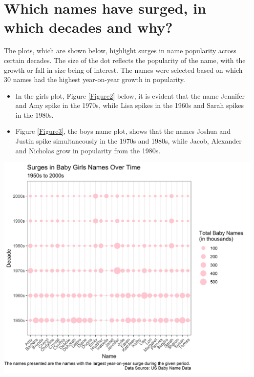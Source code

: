 \documentclass[11pt,preprint, authoryear]{elsarticle}
\let\origfigure\figure
\let\endorigfigure\endfigure
\renewenvironment{figure}[1][2] {
    \expandafter\origfigure\expandafter[H]
} {
    \endorigfigure
}
\numberwithin{equation}{section}
\numberwithin{figure}{section}
\numberwithin{table}{section}
\begin{document}
\newpage

\hypertarget{which-names-have-surged-in-which-decades-and-why}{%
\section{\texorpdfstring{Which names have surged, in which decades and
why?
\label{surge}}{Which names have surged, in which decades and why? }}\label{which-names-have-surged-in-which-decades-and-why}}

The plots, which are shown below, highlight surges in name popularity
across certain decades. The size of the dot reflects the popularity of
the name, with the growth or fall in size being of interest. The names
were selected based on which 30 names had the highest year-on-year
growth in popularity.

\begin{itemize}
\item
  In the girls plot, Figure \ref{Figure2} below, it is evident that the
  name Jennifer and Amy spike in the 1970s, while Lisa spikes in the
  1960s and Sarah spikes in the 1980s.
\item
  Figure \ref{Figure3}, the boys name plot, shows that the names Joshua
  and Justin spike simultaneously in the 1970s and 1980s, while Jacob,
  Alexander and Nicholas grow in popularity from the 1980s.
\end{itemize}

\begin{figure}[H]

{\centering \includegraphics{Question_1_files/figure-latex/Figure2-1} 

}

\caption{Surge in Girls Names \label{Figure2}}\label{fig:Figure2}
\end{figure}
\end{document}
